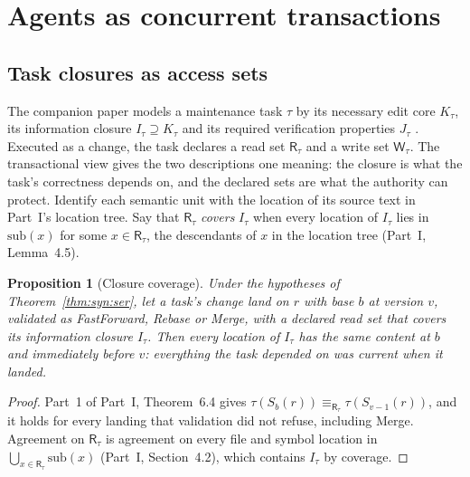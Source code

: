 \documentclass[11pt,letterpaper]{article}
\newtheorem{proposition}[theorem]{Proposition}
\theoremstyle{definition}
\theoremstyle{remark}
\newcommand{\R}{\mathsf{R}}
\newcommand{\W}{\mathsf{W}}
\newcommand{\Snap}[1]{S_{#1}}
\newcommand{\tree}{\tau}
\begin{document}
\section{Agents as concurrent transactions}
\label{sec:syn:agents}

\subsection{Task closures as access sets}

The companion paper models a maintenance task $\tau$ by its necessary edit core $K_\tau$, its information closure $I_\tau\supseteq K_\tau$ and its required verification properties $J_\tau$ \cite{long2026inversion}. Executed as a change, the task declares a read set $\R_\tau$ and a write set $\W_\tau$. The transactional view gives the two descriptions one meaning: the closure is what the task's correctness depends on, and the declared sets are what the authority can protect. Identify each semantic unit with the location of its source text in Part~I's location tree. Say that $\R_\tau$ \emph{covers} $I_\tau$ when every location of $I_\tau$ lies in $\mathrm{sub}(x)$ for some $x\in\R_\tau$, the descendants of $x$ in the location tree (Part~I, Lemma~4.5).

\begin{proposition}[Closure coverage]
\label{prop:syn:closure}
Under the hypotheses of Theorem~\ref{thm:syn:ser}, let a task's change land on $r$ with base $b$ at version $v$, validated as FastForward, Rebase or Merge, with a declared read set that covers its information closure $I_\tau$. Then every location of $I_\tau$ has the same content at $b$ and immediately before $v$: everything the task depended on was current when it landed.
\end{proposition}

\begin{proof}
Part~1 of Part~I, Theorem~6.4 gives $\tree(\Snap{b}(r))\equiv_{\R_\tau}\tree(\Snap{v-1}(r))$, and it holds for every landing that validation did not refuse, including Merge. Agreement on $\R_\tau$ is agreement on every file and symbol location in $\bigcup_{x\in\R_\tau}\mathrm{sub}(x)$ (Part~I, Section~4.2), which contains $I_\tau$ by coverage.
\end{proof}
\end{document}
